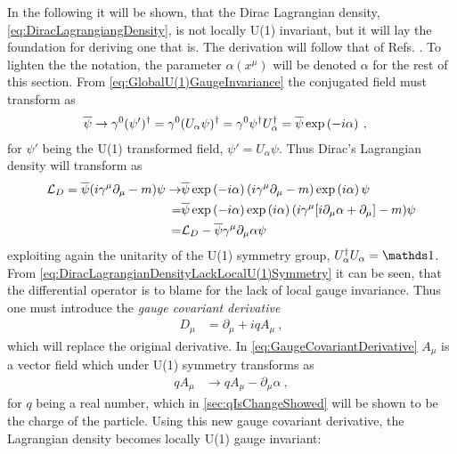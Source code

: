 \documentclass[../main.tex]{subfiles} %
\begin{document}
In the following it will be shown, that the Dirac Lagrangian density, \cref{eq:DiracLagrangiangDensity}, is not locally U(1) invariant, but it will lay the foundation for deriving one that is. The derivation will follow that of Refs. \cite{peskin_introToQFT_1995, griffiths_introToElementaryParticles_2008, panyella_masterThesis_2019}. To lighten the the notation, the parameter $\alpha(x^\mu)$ will be denoted $\alpha$ for the rest of this section. From \cref{eq:GlobalU(1)GaugeInvariance} the conjugated field must transform as
\begin{align}
    \psibar &\rightarrow \gamma^0 (\psi')\dagger
        = \gamma^0 (U_\alpha \psi)\dagger
        = \gamma^0\psi\dagger U_\alpha\dagger
        = \psibar\exp{-i\alpha} \: ,
\end{align}
for $\psi'$ being the U(1) transformed field, $\psi' = U_\alpha \psi$. Thus Dirac's Lagrangian density will transform as
\begin{align} \label{eq:DiracLagrangianDensityLackLocalU(1)Symmetry}
\begin{split}
    \L_D = \psibar (i \gamma^\mu \partial_\mu - m) \psi \rightarrow
        & \psibar \exp{-i\alpha} (i \gamma^\mu \partial_\mu - m) \exp{i\alpha} \psi \\
        =& \psibar \exp{-i\alpha} \exp{i\alpha} (i \gamma^\mu [i \partial_\mu \alpha + \partial_\mu] - m) \psi \\
        =& \L_D - \psibar\gamma^\mu \partial_\mu \alpha \psi
\end{split}
\end{align}
exploiting again the unitarity of the U(1) symmetry group, $U_\alpha\dagger U_\alpha = \id$. From \cref{eq:DiracLagrangianDensityLackLocalU(1)Symmetry} it can be seen, that the differential operator is to blame for the lack of local gauge invariance. Thus one must introduce the \emph{gauge covariant derivative}
\begin{align} \label{eq:GaugeCovariantDerivative}
    D_\mu &= \partial_\mu + iqA_\mu \: ,
\end{align}
which will replace the original derivative. In \cref{eq:GaugeCovariantDerivative} $A_\mu$ is a vector field which under U(1) symmetry transforms as
\begin{align}
    qA_\mu &\rightarrow qA_\mu - \partial_\mu\alpha \: ,
\end{align}
for $q$ being a real number, which in \cref{sec:qIsChangeShowed} will be shown to be the charge of the particle. Using this new gauge covariant derivative, the Lagrangian density becomes locally U(1) gauge invariant:
\end{document}
